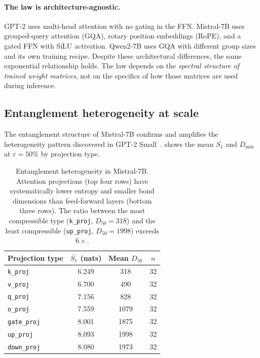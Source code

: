 \documentclass[11pt,a4paper]{article}
\newcommand{\Dmin}{D_{\min}}
\newcommand{\Svn}{S_1}
\begin{document}
\paragraph{The law is architecture-agnostic.}
GPT-2 uses multi-head attention with no gating in the FFN.
Mistral-7B uses grouped-query attention (GQA), rotary position
embeddings (RoPE), and a gated FFN with SiLU activation.
Qwen2-7B uses GQA with different group sizes and its own
training recipe.  Despite these architectural differences, the same
exponential relationship holds.  The law depends on the
\emph{spectral structure of trained weight matrices}, not on the
specifics of how those matrices are used during inference.

\subsection{Entanglement heterogeneity at scale}
\label{sec:scale-heterogeneity}

The entanglement structure of Mistral-7B confirms and amplifies the
heterogeneity pattern discovered in GPT-2
Small~\citep{calderon2026cartography}.  
shows the mean $\Svn$ and $\Dmin$ at $\varepsilon = 50\%$ by
projection type.

\begin{table}[htbp]
\centering
\caption{Entanglement heterogeneity in Mistral-7B.  Attention
  projections (top four rows) have systematically lower entropy and
  smaller bond dimensions than feed-forward layers (bottom three
  rows).  The ratio between the most compressible type
  (\texttt{k\_proj}, $D_{50} = 318$) and the least compressible
  (\texttt{up\_proj}, $D_{50} = 1998$) exceeds $6\times$.}
\label{tab:mistral-heterogeneity}
\begin{tabular}{@{}lccc@{}}
\toprule
Projection type & $\bar{\Svn}$ (nats) & Mean $D_{50}$ & $n$ \\
\midrule
\texttt{k\_proj}    & 6.249 &  318 & 32 \\
\texttt{v\_proj}    & 6.700 &  490 & 32 \\
\texttt{q\_proj}    & 7.156 &  828 & 32 \\
\texttt{o\_proj}    & 7.559 & 1079 & 32 \\
\midrule
\texttt{gate\_proj} & 8.001 & 1875 & 32 \\
\texttt{up\_proj}   & 8.093 & 1998 & 32 \\
\texttt{down\_proj} & 8.080 & 1973 & 32 \\
\bottomrule
\end{tabular}
\end{table}
\end{document}
